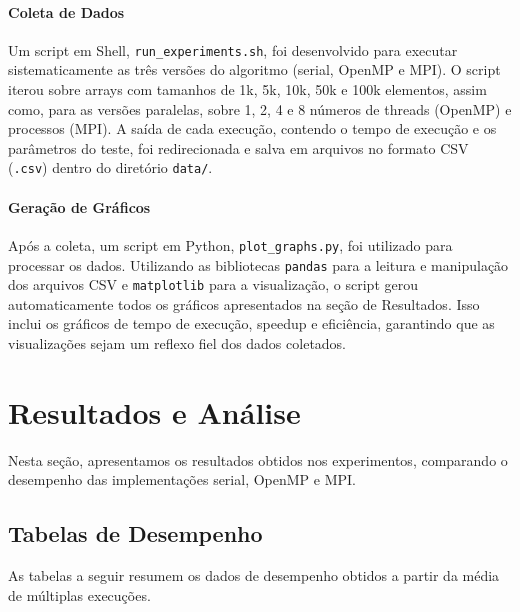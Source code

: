 \documentclass[12pt, a4paper]{article}
\begin{document}
\paragraph{Coleta de Dados}
Um script em Shell, \texttt{run\_experiments.sh}, foi desenvolvido para executar sistematicamente as três versões do algoritmo (serial, OpenMP e MPI). O script iterou sobre arrays com tamanhos de 1k, 5k, 10k, 50k e 100k elementos, assim como, para as versões paralelas, sobre 1, 2, 4 e 8 números de threads (OpenMP) e processos (MPI). A saída de cada execução, contendo o tempo de execução e os parâmetros do teste, foi redirecionada e salva em arquivos no formato CSV (\texttt{.csv}) dentro do diretório \texttt{data/}.

\paragraph{Geração de Gráficos}
Após a coleta, um script em Python, \texttt{plot\_graphs.py}, foi utilizado para processar os dados. Utilizando as bibliotecas \texttt{pandas} para a leitura e manipulação dos arquivos CSV e \texttt{matplotlib} para a visualização, o script gerou automaticamente todos os gráficos apresentados na seção de Resultados. Isso inclui os gráficos de tempo de execução, speedup e eficiência, garantindo que as visualizações sejam um reflexo fiel dos dados coletados.

\section{Resultados e Análise}
Nesta seção, apresentamos os resultados obtidos nos experimentos, comparando o desempenho das implementações serial, OpenMP e MPI.



\subsection{Tabelas de Desempenho}
As tabelas a seguir resumem os dados de desempenho obtidos a partir da média de múltiplas execuções.
\end{document}
